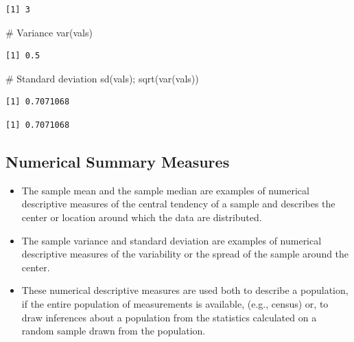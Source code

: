 \documentclass[
  letterpaper,
  DIV=11,
  numbers=noendperiod]{scrartcl}
\newenvironment{Shaded}{\begin{snugshade}}{\end{snugshade}}
\newcommand{\CommentTok}[1]{\textcolor[rgb]{0.37,0.37,0.37}{#1}}
\newcommand{\FunctionTok}[1]{\textcolor[rgb]{0.28,0.35,0.67}{#1}}
\newcommand{\NormalTok}[1]{\textcolor[rgb]{0.00,0.23,0.31}{#1}}
\begin{document}
\begin{verbatim}
[1] 3
\end{verbatim}

\begin{Shaded}
\begin{Highlighting}[]
\CommentTok{\# Variance}
\FunctionTok{var}\NormalTok{(vals)}
\end{Highlighting}
\end{Shaded}

\begin{verbatim}
[1] 0.5
\end{verbatim}

\begin{Shaded}
\begin{Highlighting}[]
\CommentTok{\# Standard deviation}
\FunctionTok{sd}\NormalTok{(vals); }\FunctionTok{sqrt}\NormalTok{(}\FunctionTok{var}\NormalTok{(vals))}
\end{Highlighting}
\end{Shaded}

\begin{verbatim}
[1] 0.7071068
\end{verbatim}

\begin{verbatim}
[1] 0.7071068
\end{verbatim}

\subsection{Numerical Summary
Measures}\label{numerical-summary-measures}

\begin{itemize}
\item
  The sample mean and the sample median are examples of {numerical
  descriptive measures} of the {central tendency} of a sample and
  describes the center or location around which the data are
  distributed.
\item
  The sample variance and standard deviation are examples of {numerical
  descriptive measures} of the {variability} or the {spread} of the
  sample around the center.
\item
  These numerical descriptive measures are used both to describe a
  population, if the entire population of measurements is available,
  (e.g., census) or, to draw inferences about a population from the
  statistics calculated on a random sample drawn from the population.
\end{itemize}
\end{document}
